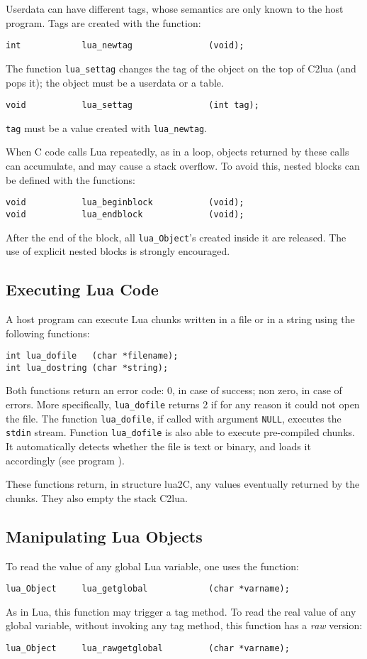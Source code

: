 Userdata can have different tags,
whose semantics are only known to the host program.
Tags are created with the function:
\begin{verbatim}
int            lua_newtag               (void);
\end{verbatim}
The function \verb|lua_settag| changes the tag of
the object on the top of C2lua (and pops it);
the object must be a userdata or a table.
\begin{verbatim}
void           lua_settag               (int tag);
\end{verbatim}
\verb|tag| must be a value created with \verb|lua_newtag|.

When C code calls Lua repeatedly, as in a loop,
objects returned by these calls can accumulate,
and may cause a stack overflow.
To avoid this,
nested blocks can be defined with the functions:
\begin{verbatim}
void           lua_beginblock           (void);
void           lua_endblock             (void);
\end{verbatim}
After the end of the block,
all \verb|lua_Object|'s created inside it are released.
The use of explicit nested blocks is strongly encouraged.

\subsection{Executing Lua Code}
A host program can execute Lua chunks written in a file or in a string
using the following functions:
\begin{verbatim}
int lua_dofile   (char *filename);
int lua_dostring (char *string);
\end{verbatim}
Both functions return an error code:
0, in case of success; non zero, in case of errors.
More specifically, \verb|lua_dofile| returns 2 if for any reason
it could not open the file.
The function \verb|lua_dofile|, if called with argument \verb|NULL|,
executes the \verb|stdin| stream.
Function \verb|lua_dofile| is also able to execute pre-compiled chunks.
It automatically detects whether the file is text or binary,
and loads it accordingly (see program ).

These functions return, in structure lua2C,
any values eventually returned by the chunks.
They also empty the stack C2lua.


\subsection{Manipulating Lua Objects}
To read the value of any global Lua variable,
one uses the function:
\begin{verbatim}
lua_Object     lua_getglobal            (char *varname);
\end{verbatim}
As in Lua, this function may trigger a tag method.
To read the real value of any global variable,
without invoking any tag method,
this function has a \emph{raw} version:
\begin{verbatim}
lua_Object     lua_rawgetglobal         (char *varname);
\end{verbatim}

